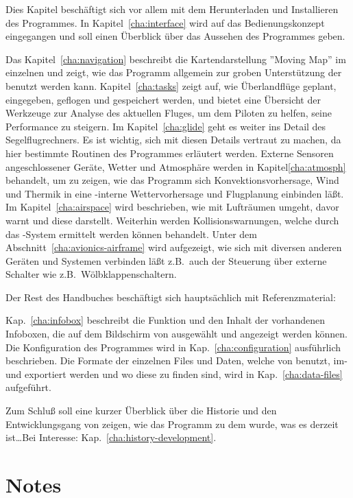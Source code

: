 Dies Kapitel beschäftigt sich vor allem mit dem Herunterladen und Installieren des Programmes. 
In Kapitel~\ref{cha:interface} wird auf das Bedienungskonzept eingegangen und soll einen Überblick über das Aussehen des Programmes geben.

Das Kapitel~\ref{cha:navigation} beschreibt die Kartendarstellung ''Moving Map'' im einzelnen  und zeigt, wie das Programm allgemein 
zur groben Unterstützung der benutzt werden kann. Kapitel~\ref{cha:tasks} zeigt auf, wie Überlandflüge geplant, eingegeben, geflogen und gespeichert werden, und bietet eine Übersicht
der Werkzeuge zur Analyse des aktuellen Fluges, um dem Piloten zu helfen,  seine Performance zu steigern.
Im Kapitel~\ref{cha:glide} geht es weiter ins Detail des Segelflugrechners. 
Es ist wichtig, sich mit diesen Details vertraut zu machen, da hier bestimmte Routinen des Programmes erläutert werden.
Externe Sensoren angeschlossener Geräte, Wetter und Atmosphäre werden in Kapitel\ref{cha:atmosph} behandelt, um zu zeigen, wie das Programm 
sich Konvektionsvorhersage, Wind und Thermik in eine \xc-interne Wettervorhersage und Flugplanung einbinden läßt.  
Im Kapitel~\ref{cha:airspace} wird beschrieben, wie \xc mit Lufträumen umgeht, davor warnt und diese darstellt. 
Weiterhin werden Kollisionswarnungen, welche durch das \fl-System ermittelt werden können behandelt.
Unter dem Abschnitt~\ref{cha:avionics-airframe} wird aufgezeigt, wie sich \xc mit diversen anderen Geräten und Systemen 
verbinden läßt z.B.\ auch der Steuerung über externe Schalter wie z.B.\ Wölbklappenschaltern. 

Der Rest des Handbuches beschäftigt sich hauptsächlich mit Referenzmaterial:

Kap.~\ref{cha:infobox} beschreibt die Funktion und den Inhalt der vorhandenen Infoboxen, die auf dem Bildschirm von \xc ausgewählt und angezeigt werden können.
Die Konfiguration des Programmes wird in Kap.~\ref{cha:configuration} ausführlich beschrieben. 
Die Formate der einzelnen Files und Daten, welche von \xc benutzt, im- und exportiert werden und wo diese zu finden sind, 
wird in Kap.~\ref{cha:data-files} aufgeführt. 

Zum Schluß soll eine kurzer Überblick über die Historie und den Entwicklungsgang von \xc zeigen, wie das Programm zu dem wurde, was 
es derzeit ist\dots Bei Interesse: Kap.~\ref{cha:history-development}.

\section{Notes}


